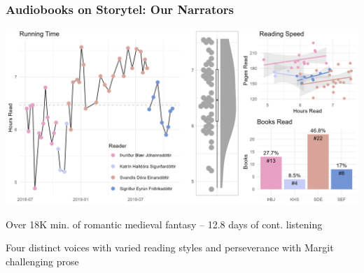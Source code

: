 \begin{frame}
    \frametitle{Audiobooks on Storytel: Our Narrators}
    \includegraphics[width=\textwidth]{../R/figures/storytel_readers}
    \vspace{-18pt}

    Over 18K min. of romantic medieval fantasy -- 12.8 days of cont. listening

    Four distinct voices with varied reading styles and perseverance with Margit challenging prose


\end{frame}
